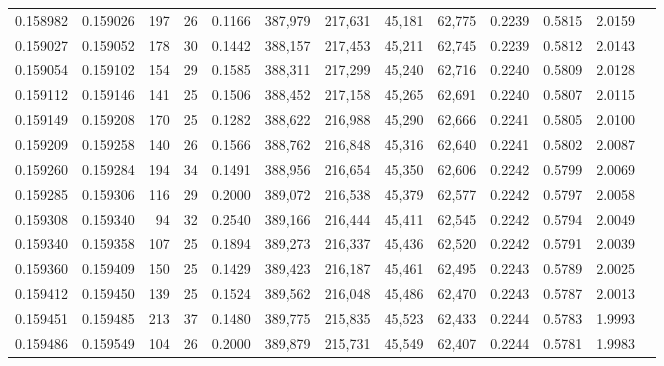 \begin{tabular}{rrrrrrrrrrrrr}
0.158982 & 0.159026 & 197 &  26 &                                     0.1166 & 387,979 & 217,631 &  45,181 &  62,775 & 0.2239 & 0.5815 & 2.0159 \\
0.159027 & 0.159052 & 178 &  30 &                                     0.1442 & 388,157 & 217,453 &  45,211 &  62,745 & 0.2239 & 0.5812 & 2.0143 \\
0.159054 & 0.159102 & 154 &  29 &                                     0.1585 & 388,311 & 217,299 &  45,240 &  62,716 & 0.2240 & 0.5809 & 2.0128 \\
0.159112 & 0.159146 & 141 &  25 &                                     0.1506 & 388,452 & 217,158 &  45,265 &  62,691 & 0.2240 & 0.5807 & 2.0115 \\
0.159149 & 0.159208 & 170 &  25 &                                     0.1282 & 388,622 & 216,988 &  45,290 &  62,666 & 0.2241 & 0.5805 & 2.0100 \\
0.159209 & 0.159258 & 140 &  26 &                                     0.1566 & 388,762 & 216,848 &  45,316 &  62,640 & 0.2241 & 0.5802 & 2.0087 \\
0.159260 & 0.159284 & 194 &  34 &                                     0.1491 & 388,956 & 216,654 &  45,350 &  62,606 & 0.2242 & 0.5799 & 2.0069 \\
0.159285 & 0.159306 & 116 &  29 &                                     0.2000 & 389,072 & 216,538 &  45,379 &  62,577 & 0.2242 & 0.5797 & 2.0058 \\
0.159308 & 0.159340 &  94 &  32 &                                     0.2540 & 389,166 & 216,444 &  45,411 &  62,545 & 0.2242 & 0.5794 & 2.0049 \\
0.159340 & 0.159358 & 107 &  25 &                                     0.1894 & 389,273 & 216,337 &  45,436 &  62,520 & 0.2242 & 0.5791 & 2.0039 \\
0.159360 & 0.159409 & 150 &  25 &                                     0.1429 & 389,423 & 216,187 &  45,461 &  62,495 & 0.2243 & 0.5789 & 2.0025 \\
0.159412 & 0.159450 & 139 &  25 &                                     0.1524 & 389,562 & 216,048 &  45,486 &  62,470 & 0.2243 & 0.5787 & 2.0013 \\
0.159451 & 0.159485 & 213 &  37 &                                     0.1480 & 389,775 & 215,835 &  45,523 &  62,433 & 0.2244 & 0.5783 & 1.9993 \\
0.159486 & 0.159549 & 104 &  26 &                                     0.2000 & 389,879 & 215,731 &  45,549 &  62,407 & 0.2244 & 0.5781 & 1.9983 \\

\end{tabular}
